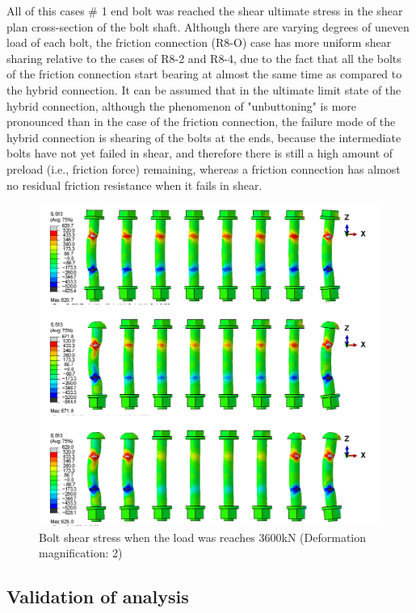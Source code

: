 All of this cases \# 1 end bolt was reached the shear ultimate stress in the shear plan cross-section of the bolt shaft.
Although there are varying degrees of uneven load of each bolt, the friction connection (R8-O) case has more uniform shear sharing relative to the cases of R8-2 and R8-4, due to the fact that all the bolts of the friction connection start bearing at almost the same time as compared to the hybrid connection. It can be assumed that in the ultimate limit state of the hybrid connection, although the phenomenon of "unbuttoning" is more pronounced than in the case of the friction connection, the failure mode of the hybrid connection is shearing of the bolts at the ends, because the intermediate bolts have not yet failed in shear, and therefore there is still a high amount of preload (i.e., friction force) remaining, whereas a friction connection has almost no residual friction resistance when it fails in shear.

\begin{figure}[htbp]
    \centering
    \includegraphics[width=\linewidth]{imgs/ch5/bshear_R8.png}
    \caption{Bolt shear stress when the load was reaches 3600kN (Deformation magnification: 2) }
    \label{fig-bshearr8}
\end{figure}

\subsection{Validation of analysis}

